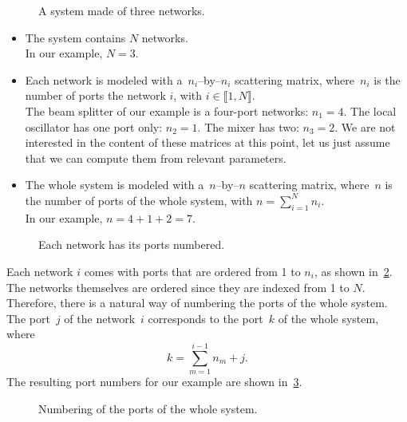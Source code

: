 \begin{figure}[hbtp]
    \centering
    
    \caption{A system made of three networks.}
    \label{fig:implementation_0}
\end{figure}

\begin{itemize}
    \item 
The system contains $N$ networks.
\\In our example, $N=3$.
    \item 
Each network is modeled with a~$n_i$--by--$n_i$ scattering matrix, where~$n_i$ is the number of ports the network $i$, with $i \in \llbracket 1, N \rrbracket$.
\\
The beam splitter of our example is a four-port networks: $n_1=4$.
The local oscillator has one port only: $n_2=1$.
The mixer has two: $n_3=2$.
We are not interested in the content of these matrices at this point, let us just assume that we can compute them from relevant parameters.
    \item 
The whole system is modeled with a~$n$--by--$n$ scattering matrix, where~$n$ is the number of ports of the whole system, with $n = \sum_{i=1}^N n_i$.
\\
In our example, $n=4+1+2=7$.
\end{itemize}

\begin{figure}[hbtp]
    \centering
    
    \caption{Each network has its ports numbered.}
    \label{fig:implementation_1}
\end{figure}

Each network $i$ comes with ports that are ordered from 1 to $n_i$, as shown in~\cref{fig:implementation_1}.
The networks themselves are ordered since they are indexed from 1 to $N$.
Therefore, there is a natural way of numbering the ports of the whole system.
The port~$j$ of the network~$i$ corresponds to the port~$k$ of the whole system, where
\begin{equation}
    k = \sum_{m=1}^{i - 1}n_m + j\text{.} \label{eq:port_numbering}
\end{equation}
The resulting port numbers for our example are shown in~\cref{fig:implementation_2}.

\begin{figure}[hbtp]
    \centering
    
    \caption{Numbering of the ports of the whole system.}
    \label{fig:implementation_2}
\end{figure}

